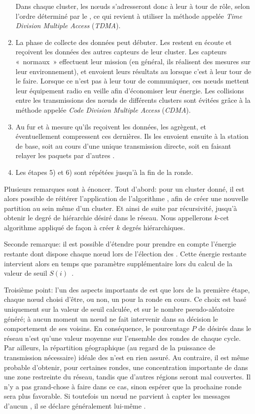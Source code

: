 \begin{enumerate}
        Dans chaque cluster, les nœuds s'adresseront donc à leur \ch à tour de rôle, selon l'ordre déterminé par le \CH, ce qui revient à utiliser la méthode appelée \textit{Time Division Multiple Access} (\textit{TDMA}).
    \item La phase de collecte des données peut débuter.
        Les \chs restent en écoute et reçoivent les données des autres capteurs de leur cluster.
        Les capteurs «~normaux~» effectuent leur mission (en général, ils réalisent des mesures sur leur environnement), et envoient leurs résultats au \ch lorsque c'est à leur tour de le faire.
        Lorsque ce n'est pas à leur tour de communiquer, ces nœuds mettent leur équipement radio en veille afin d'économiser leur énergie.
        Les collisions entre les transmissions des nœuds de différents clusters sont évitées grâce à la méthode appelée \textit{Code Division Multiple Access} (\textit{CDMA}).
    \item Au fur et à mesure qu'ils reçoivent les données, les \chs agrègent, et éventuellement compressent ces dernières.
        Ils les envoient ensuite à la station de base, soit au cours d'une unique transmission directe, soit en faisant relayer les paquets par d'autres \chs.
    \item Les étapes 5) et 6) sont répétées jusqu'à la fin de la ronde.
\end{enumerate}

Plusieurs remarques sont à énoncer.
Tout d'abord: pour un cluster donné, il est alors possible de réitérer l'application de l'algorithme \leach, afin de créer une nouvelle partition au sein même d'un cluster.
Et ainsi de suite par récursivité, jusqu'à obtenir le degré de hiérarchie désiré dans le réseau.
Nous appellerons $k$-\leach cet algorithme appliqué de façon à créer $k$ degrés hiérarchiques.

Seconde remarque: il est possible d'étendre \leach pour prendre en compte l'énergie restante dont dispose chaque nœud lors de l'élection des \CH.
Cette énergie restante intervient alors en temps que paramètre supplémentaire lors du calcul de la valeur de seuil $S(i)$~\cite{HHT02}.

Troisième point: l'un des aspects importants de \leach est que lors de la première étape, chaque nœud choisi d'être, ou non, un \ch pour la ronde en cours.
Ce choix est basé uniquement sur la valeur de seuil calculée, et sur le nombre pseudo-aléatoire généré; à aucun moment un nœud ne fait intervenir dans sa décision le comportement de ses voisins.
En conséquence, le pourcentage $P$ de \chs désirés dans le réseau n'est qu'une valeur moyenne sur l'ensemble des rondes de chaque cycle.
Par ailleurs, la répartition géographique (au regard de la puissance de transmission nécessaire) idéale des \chs n'est en rien assuré.
Au contraire, il est même probable d'obtenir, pour certaines rondes, une concentration importante de \chs dans une zone restreinte du réseau, tandis que d'autres régions seront mal couvertes.
Il n'y a pas grand-chose à faire dans ce cas, sinon espérer que la prochaine ronde sera plus favorable.
Si toutefois un nœud ne parvient à capter les messages d'aucun \ch, il se déclare généralement lui-même \CH.

